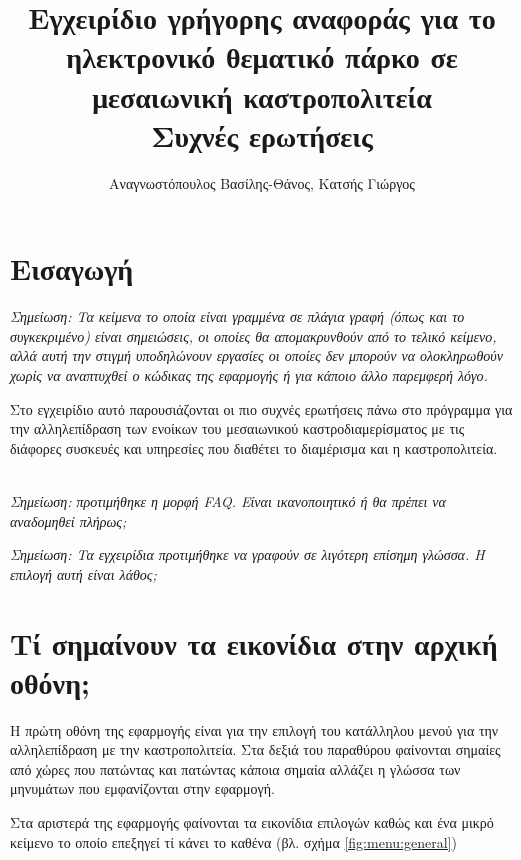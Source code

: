 \documentclass[a4paper,titlepage,twoside,12pt,leqno]{article}
\title{Εγχειρίδιο γρήγορης αναφοράς για το ηλεκτρονικό θεματικό πάρκο σε μεσαιωνική καστροπολιτεία \\ Συχνές ερωτήσεις}
\author{Αναγνωστόπουλος Βασίλης-Θάνος, Κατσής Γιώργος}
\date{}
\begin{document}
\maketitle
\tableofcontents
\listoffigures
\listoftables
\newpage

\section{Εισαγωγή}

\emph{Σημείωση: Τα κείμενα το οποία είναι γραμμένα σε πλάγια γραφή (όπως και το συγκεκριμένο) είναι σημειώσεις, οι οποίες θα απομακρυνθούν από το τελικό κείμενο, αλλά αυτή την στιγμή υποδηλώνουν εργασίες οι οποίες δεν μπορούν να ολοκληρωθούν χωρίς να αναπτυχθεί ο κώδικας της εφαρμογής ή για κάποιο άλλο παρεμφερή λόγο.\\}

Στο εγχειρίδιο αυτό παρουσιάζονται οι πιο συχνές ερωτήσεις πάνω στο πρόγραμμα για την αλληλεπίδραση των ενοίκων του μεσαιωνικού καστροδιαμερίσματος με τις διάφορες συσκευές και υπηρεσίες που διαθέτει το διαμέρισμα και η καστροπολιτεία.

\emph{\\Σημείωση: προτιμήθηκε η μορφή FAQ. Είναι ικανοποιητικό ή θα πρέπει να αναδομηθεί πλήρως;}

\emph{Σημείωση: Τα εγχειρίδια προτιμήθηκε να γραφούν σε λιγότερη επίσημη γλώσσα. Η επιλογή αυτή είναι λάθος;}

\section{Τί σημαίνουν τα εικονίδια στην αρχική οθόνη;}

Η πρώτη οθόνη της εφαρμογής είναι για την επιλογή του κατάλληλου μενού για την αλληλεπίδραση με την καστροπολιτεία. Στα δεξιά του παραθύρου φαίνονται σημαίες από χώρες που πατώντας και πατώντας κάποια σημαία αλλάζει η γλώσσα των μηνυμάτων που εμφανίζονται στην εφαρμογή.

Στα αριστερά της εφαρμογής φαίνονται τα εικονίδια επιλογών καθώς και ένα μικρό κείμενο το οποίο επεξηγεί τί κάνει το καθένα (βλ. σχήμα \ref{fig:menu:general})
\end{document}
